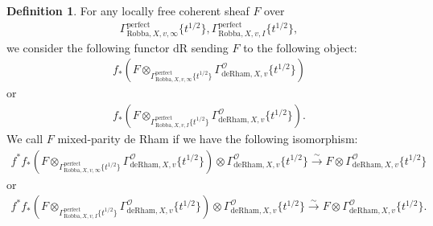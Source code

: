 \documentclass[12pt]{book}
\theoremstyle{definition}
\newtheorem{definition}{Definition}
\begin{document}
\begin{definition}
For any locally free coherent sheaf $F$ over
\begin{align}
\Gamma^\mathrm{perfect}_{\text{Robba},X,v,\infty}\{t^{1/2}\},\Gamma^\mathrm{perfect}_{\text{Robba},X,v,I}\{t^{1/2}\},
\end{align} 
we consider the following functor $\mathrm{dR}$ sending $F$ to the following object:
\begin{align}
f_*(F\otimes_{\Gamma^\mathrm{perfect}_{\text{Robba},X,v,\infty}\{t^{1/2}\}} \Gamma^\mathcal{O}_{\text{deRham},X,v}\{t^{1/2}\})
\end{align}
or 
\begin{align}
f_*(F\otimes_{\Gamma^\mathrm{perfect}_{\text{Robba},X,v,I}\{t^{1/2}\}} \Gamma^\mathcal{O}_{\text{deRham},X,v}\{t^{1/2}\}).
\end{align}
We call $F$ mixed-parity de Rham if we have the following isomorphism:
\begin{align}
f^*f_*(F\otimes_{\Gamma^\mathrm{perfect}_{\text{Robba},X,v,\infty}\{t^{1/2}\}} \Gamma^\mathcal{O}_{\text{deRham},X,v}\{t^{1/2}\}) \otimes \Gamma^\mathcal{O}_{\text{deRham},X,v}\{t^{1/2}\} \overset{\sim}{\longrightarrow} F \otimes \Gamma^\mathcal{O}_{\text{deRham},X,v}\{t^{1/2}\} 
\end{align}
or 
\begin{align}
f^*f_*(F\otimes_{\Gamma^\mathrm{perfect}_{\text{Robba},X,v,I}\{t^{1/2}\}} \Gamma^\mathcal{O}_{\text{deRham},X,v}\{t^{1/2}\}) \otimes \Gamma^\mathcal{O}_{\text{deRham},X,v}\{t^{1/2}\} \overset{\sim}{\longrightarrow} F \otimes \Gamma^\mathcal{O}_{\text{deRham},X,v}\{t^{1/2}\}. 
\end{align}
\end{definition}
\end{document}
